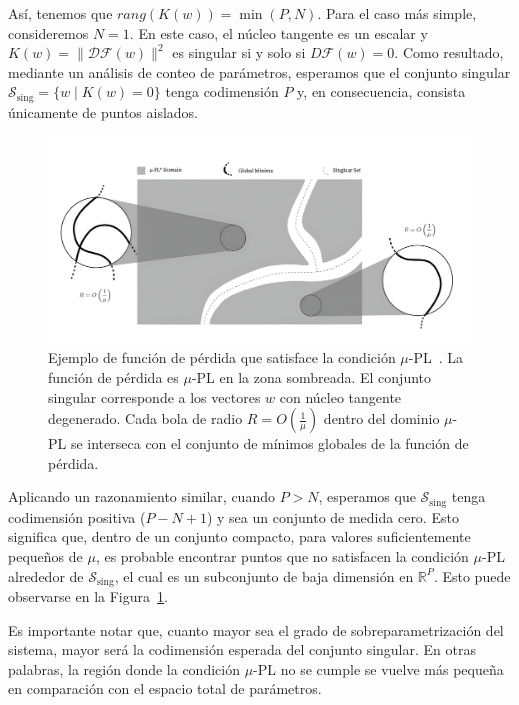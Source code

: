 Así, tenemos que $rang(K(w)) = \min(P, N)$. Para el caso más simple, consideremos $N = 1$. En este caso, el núcleo tangente es un escalar y $K(w) = \| \mathcal{DF}(w) \|^2$ es singular si y solo si $D\mathcal{F}(w) = 0$. Como resultado, mediante un análisis de conteo de parámetros, esperamos que el conjunto singular $\mathcal{S}_{\text{sing}} = \{ w \mid K(w) = 0 \}$ tenga codimensión $P$ y, en consecuencia, consista únicamente de puntos aislados.\newline

\begin{figure}[h]
    \centering
    \includegraphics[width=0.8\linewidth]{img/cosarara2.png}
    \caption[Ejemplo de función de pérdida que satisface la condición $\mu$-PL~\cite{Liu2021}.]{Ejemplo de función de pérdida que satisface la condición $\mu$-PL~\cite{Liu2021}. La función de pérdida es $\mu$-PL en la zona sombreada. El conjunto singular corresponde a los vectores $w$ con núcleo tangente degenerado. Cada bola de radio $R = O\left(\frac{1}{\mu}\right)$ dentro del dominio $\mu$-PL se interseca con el conjunto de mínimos globales de la función de pérdida.}\label{fig:cosarara2}
\end{figure}

Aplicando un razonamiento similar, cuando $P > N$, esperamos que $\mathcal{S}_{\text{sing}}$ tenga codimensión positiva ($P - N + 1$) y sea un conjunto de medida cero. Esto significa que, dentro de un conjunto compacto, para valores suficientemente pequeños de $\mu$, es probable encontrar puntos que no satisfacen la condición $\mu$-PL alrededor de $\mathcal{S}_{\text{sing}}$, el cual es un subconjunto de baja dimensión en $\mathbb{R}^P$. Esto puede observarse en la Figura~\ref{fig:cosarara2}.\newline

Es importante notar que, cuanto mayor sea el grado de sobreparametrización del sistema, mayor será la codimensión esperada del conjunto singular. En otras palabras, la región donde la condición $\mu$-PL no se cumple se vuelve más pequeña en comparación con el espacio total de parámetros.\newline

